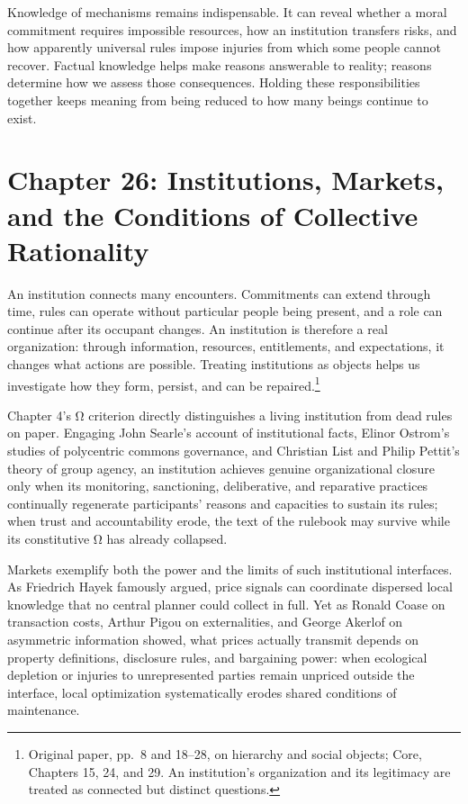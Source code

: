 \documentclass[
  english,
  11pt,
  oneside]{book}
\begin{document}
\begingroup{}

Knowledge of mechanisms remains indispensable. It can reveal whether a moral commitment requires impossible resources, how an institution transfers risks, and how apparently universal rules impose injuries from which some people cannot recover. Factual knowledge helps make reasons answerable to reality; reasons determine how we assess those consequences. Holding these responsibilities together keeps meaning from being reduced to how many beings continue to exist.

\par\endgroup

\chapter{Chapter 26: Institutions, Markets, and the Conditions of Collective Rationality}\label{ph-ch-26}

An institution connects many encounters. Commitments can extend through time, rules can operate without particular people being present, and a role can continue after its occupant changes. An institution is therefore a real organization: through information, resources, entitlements, and expectations, it changes what actions are possible. Treating institutions as objects helps us investigate how they form, persist, and can be repaired.\footnote{\hypertarget{ph-note-60}{}Original paper, pp.~8 and 18--28, on hierarchy and social objects; Core, Chapters 15, 24, and 29. An institution's organization and its legitimacy are treated as connected but distinct questions.}

Chapter 4's Ω criterion directly distinguishes a living institution from dead rules on paper. Engaging John Searle's account of institutional facts, Elinor Ostrom's studies of polycentric commons governance, and Christian List and Philip Pettit's theory of group agency, an institution achieves genuine organizational closure only when its monitoring, sanctioning, deliberative, and reparative practices continually regenerate participants' reasons and capacities to sustain its rules; when trust and accountability erode, the text of the rulebook may survive while its constitutive Ω has already collapsed.

Markets exemplify both the power and the limits of such institutional interfaces. As Friedrich Hayek famously argued, price signals can coordinate dispersed local knowledge that no central planner could collect in full. Yet as Ronald Coase on transaction costs, Arthur Pigou on externalities, and George Akerlof on asymmetric information showed, what prices actually transmit depends on property definitions, disclosure rules, and bargaining power: when ecological depletion or injuries to unrepresented parties remain unpriced outside the interface, local optimization systematically erodes shared conditions of maintenance.
\end{document}
